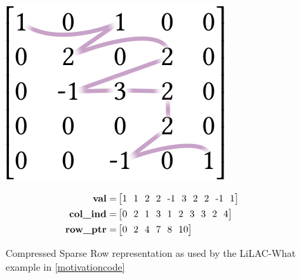 \begin{figure}[t]
\begin{minipage}[b]{0.3\linewidth}
\includegraphics[width=0.9\linewidth]{figures/csrorder.png}
\vspace{0.04em}
\end{minipage}
\begin{minipage}[b]{0.65\linewidth}
\begin{align*}
\text{\bf val} =& \begin{bmatrix}
1\ \ 1\ \ 2\ \ 2\ \ \text{-}1\ \ 3\ \ 2\ \ 2\ \ \text{-}1\ \ 1\\
\end{bmatrix}\\
\text{\bf col\_ind} =& \begin{bmatrix}
0\ \ 2\ \ 1\ \ 3\ \ 1\ \ 2\ \ 3\ \ 3\ \ 2\ \ 4\\
\end{bmatrix}\\
\text{\bf row\_ptr} =& \begin{bmatrix}
0\ \ 2\ \ 4\ \ 7\ \ 8\ \ 10\\
\end{bmatrix}
\end{align*}
\end{minipage}
\caption{Compressed Sparse Row representation as used by the LiLAC-What example
         in \autoref{motivationcode}}
\label{csr_lilacwhat_fig}
\vspace{1.5em}
\centering
\begin{minipage}[b]{0.3\linewidth}

\end{minipage}
\end{figure}
